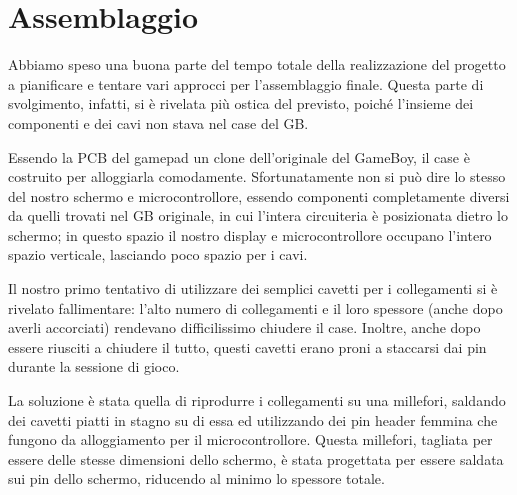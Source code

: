 \documentclass[hidelinks,12pt]{article}
\begin{document}
\section{Assemblaggio}
Abbiamo speso una buona parte del tempo totale della realizzazione del progetto
a pianificare e tentare vari approcci per l'assemblaggio finale. Questa parte di
svolgimento, infatti, si è rivelata più ostica del previsto, poiché l'insieme
dei componenti e dei cavi non stava nel case del GB.

Essendo la PCB del gamepad un clone dell'originale del GameBoy, il case è
costruito per alloggiarla comodamente. Sfortunatamente non si può dire lo stesso
del nostro schermo e microcontrollore, essendo componenti completamente diversi
da quelli trovati nel GB originale, in cui l'intera circuiteria è posizionata
dietro lo schermo; in questo spazio il nostro display e microcontrollore
occupano l'intero spazio verticale, lasciando poco spazio per i cavi.

Il nostro primo tentativo di utilizzare dei semplici cavetti per i collegamenti
si è rivelato fallimentare: l'alto numero di collegamenti e il loro spessore
(anche dopo averli accorciati) rendevano difficilissimo chiudere il case.
Inoltre, anche dopo essere riusciti a chiudere il tutto, questi cavetti erano
proni a staccarsi dai pin durante la sessione di gioco.

La soluzione è stata quella di riprodurre i collegamenti su una millefori,
saldando dei cavetti piatti in stagno su di essa ed utilizzando dei pin header
femmina che fungono da alloggiamento per il microcontrollore.
Questa millefori, tagliata per essere delle stesse dimensioni dello schermo, è
stata progettata per essere saldata sui pin dello schermo, riducendo al minimo
lo spessore totale.
\end{document}
